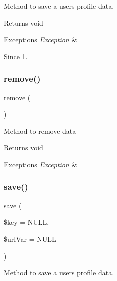Method to save a user\textquotesingle{}s profile data.

\begin{DoxyReturn}{Returns}
void
\end{DoxyReturn}

\begin{DoxyExceptions}{Exceptions}
{\em Exception} & \\
\hline
\end{DoxyExceptions}
\begin{DoxySince}{Since}
1. 
\end{DoxySince}
\mbox{\label{classtks__agenda_controller_item_form_aff9a1fb07dca963c2c9a8ffe66b45ded}} 
\subsubsection{remove()}
{\footnotesize\ttfamily remove (\begin{DoxyParamCaption}{ }\end{DoxyParamCaption})}

Method to remove data

\begin{DoxyReturn}{Returns}
void
\end{DoxyReturn}

\begin{DoxyExceptions}{Exceptions}
{\em Exception} & \\
\hline
\end{DoxyExceptions}
\mbox{\label{classtks__agenda_controller_item_form_ac00855ace03b6824b4e1bdc9060ebab0}} 
\subsubsection{save()}
{\footnotesize\ttfamily save (\begin{DoxyParamCaption}\item[{}]{\$key = {\ttfamily NULL},  }\item[{}]{\$url\+Var = {\ttfamily NULL} }\end{DoxyParamCaption})}

Method to save a user\textquotesingle{}s profile data.

